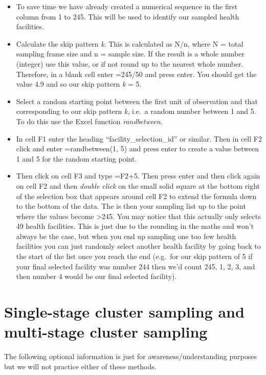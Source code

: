 \documentclass[
]{book}
\begin{document}
\begin{itemize}
\item
  To save time we have already created a numerical sequence in the first column from 1 to 245. This will be used to identify our sampled health facilities.
\item
  Calculate the skip pattern \emph{k}. This is calculated as N/n, where N = total sampling frame size and n = sample size. If the result is a whole number (integer) use this value, or if not round up to the nearest whole number. Therefore, in a blank cell enter =245/50 and press enter. You should get the value 4.9 and so our skip pattern \emph{k} = 5.
\item
  Select a random starting point between the first unit of observation and that corresponding to our skip pattern \emph{k}, i.e.~a random number between 1 and 5. To do this use the Excel function \emph{randbetween}.
\item
  In cell F1 enter the heading ``facility\_selection\_id'' or similar. Then in cell F2 click and enter =randbetween(1, 5) and press enter to create a value between 1 and 5 for the random starting point.
\item
  Then click on cell F3 and type =F2+5. Then press enter and then click again on cell F2 and then \emph{double click} on the small solid square at the bottom right of the selection box that appears around cell F2 to extend the formula down to the bottom of the data. The is then your sampling list up to the point where the values become \textgreater245. You may notice that this actually only selects 49 health facilities. This is just due to the rounding in the maths and won't always be the case, but when you end up sampling one too few health facilities you can just randomly select another health facility by going back to the start of the list once you reach the end (e.g.~for our skip pattern of 5 if your final selected facility was number 244 then we'd count 245, 1, 2, 3, and then number 4 would be our final selected facility).
\end{itemize}

\hypertarget{single-stage-cluster-sampling-and-multi-stage-cluster-sampling}{%
\section{Single-stage cluster sampling and multi-stage cluster sampling}\label{single-stage-cluster-sampling-and-multi-stage-cluster-sampling}}

The following optional information is just for awareness/understanding purposes but we will not practice either of these methods.
\end{document}
